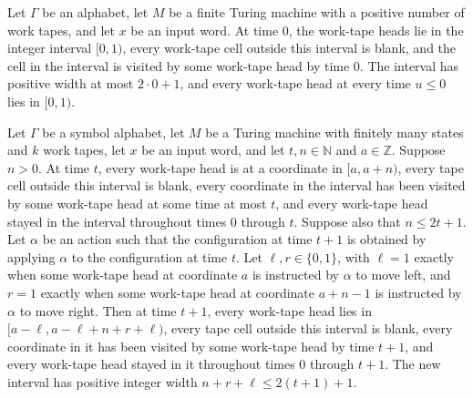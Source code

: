 \begin{lemma}
\label{Turing.FinTM.dgWindow_init}
\leanok
{}
Let $\Gamma$ be an alphabet, let $M$ be a finite Turing machine with a positive number
of work tapes, and let $x$ be an input word. At time $0$, the work-tape heads lie in the
integer interval $[0,1)$, every work-tape cell outside this interval is blank, and the
cell in the interval is visited by some work-tape head by time $0$. The interval has
positive width at most $2\cdot 0+1$, and every work-tape head at every time $u\le 0$
lies in $[0,1)$.
\end{lemma}

\begin{lemma}
\label{Turing.FinTM.dgWindow_step}
\leanok
{}
Let $\Gamma$ be a symbol alphabet, let $M$ be a Turing machine with finitely many states
and $k$ work tapes, let $x$ be an input word, and let $t,n\in\mathbb{N}$ and
$a\in\mathbb{Z}$. Suppose $n>0$. At time $t$, every work-tape head is at a coordinate in
$[a,a+n)$, every tape cell outside this interval is blank, every coordinate in the
interval has been visited by some work-tape head at some time at most $t$, and every
work-tape head stayed in the interval throughout times $0$ through $t$. Suppose also
that $n\le 2t+1$. Let $\alpha$ be an action such that the configuration at time $t+1$ is
obtained by applying $\alpha$ to the configuration at time $t$. Let $\ell,r\in\{0,1\}$,
with $\ell=1$ exactly when some work-tape head at coordinate $a$ is instructed by
$\alpha$ to move left, and $r=1$ exactly when some work-tape head at coordinate $a+n-1$
is instructed by $\alpha$ to move right. Then at time $t+1$, every work-tape head lies
in $[a-\ell,a-\ell+n+r+\ell)$, every tape cell outside this interval is blank, every
coordinate in it has been visited by some work-tape head by time $t+1$, and every
work-tape head stayed in it throughout times $0$ through $t+1$. The new interval has
positive integer width $n+r+\ell\le 2(t+1)+1$.
\end{lemma}

